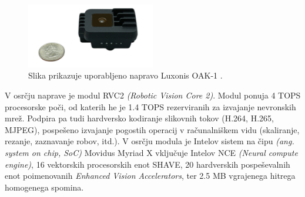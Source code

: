 \documentclass[a4paper,12pt,openright]{book}
\begin{document}
\begin{figure}[ht]
    \begin{center}
        \includegraphics[width=0.5\textwidth]{img/oak-1.png}
    \end{center}
    \caption{Slika prikazuje uporabljeno napravo Luxonis OAK-1 \cite{luxonis}.}
    \label{img:oak}
\end{figure}

V osrčju naprave je modul RVC2 \emph{(Robotic Vision Core 2)}. Modul ponuja 4 TOPS procesorske poči, od katerih he je 1.4 TOPS rezerviranih za izvajanje nevronskih mrež. Podpira pa tudi hardversko kodiranje slikovnih tokov (H.264, H.265, MJPEG), pospešeno izvajanje pogostih operacij v računalniškem vidu (skaliranje, rezanje, zaznavanje robov, itd.). V osrčju modula je Intelov sistem na čipu \emph{(ang. system on chip, SoC)} Movidus Myriad X vključuje Intelov NCE \emph{(Neural compute engine)}, 16 vektorskih procesorskih enot SHAVE, 20 hardverskih pospeševalnih enot poimenovanih \emph{Enhanced Vision Accelerators}, ter 2.5 MB vgrajenega hitrega homogenega spomina.
\end{document}
